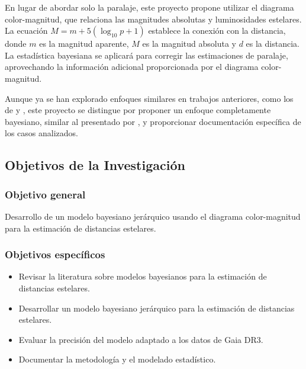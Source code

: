 \documentclass[stu, 12pt, letterpaper, donotrepeattitle, floatsintext, natbib]{apa7_ula}
\begin{document}
En lugar de abordar solo la paralaje, este proyecto propone utilizar
el diagrama color-magnitud, que relaciona las magnitudes absolutas y
luminosidades estelares. La ecuación $\displaystyle M=m+5\left(\log_{10}p+1\right)$
establece la conexión con la distancia, donde $m$ es la magnitud aparente, $M$ es la
magnitud absoluta y $d$ es la distancia. La estadística bayesiana se
aplicará para corregir las estimaciones de paralaje, aprovechando
la información adicional proporcionada por el diagrama color-magnitud.

Aunque ya se han explorado enfoques similares en trabajos anteriores,
como los de \citet{Anderson_2017} y \citet{Zhang_2023},
este proyecto se distingue por proponer un enfoque completamente bayesiano,
similar al presentado por \citet{Leistedt_2017}, y proporcionar documentación
específica de los casos analizados.


\subsection{Objetivos de la Investigación}

\subsubsection{Objetivo general}

Desarrollo de un modelo bayesiano jerárquico usando el
diagrama color-magnitud para la estimación de distancias estelares.

\subsubsection{Objetivos específicos}

\begin{itemize}
    \item Revisar la literatura sobre modelos bayesianos para la estimación de distancias estelares.
    \item Desarrollar un modelo bayesiano jerárquico para la estimación de distancias estelares.
    \item Evaluar la precisión del modelo adaptado a los datos de Gaia DR3.
    \item Documentar la metodología y el modelado estadístico.
\end{itemize}
\end{document}
